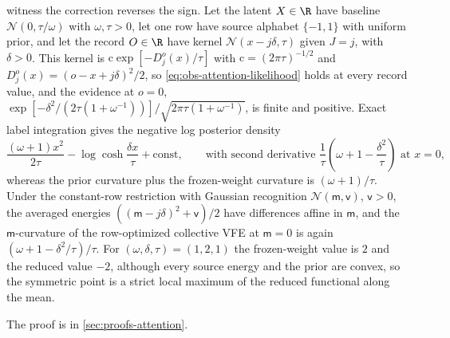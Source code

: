witness the correction reverses the sign. Let the latent \(X\in\R\) have
baseline \(\mathcal N(0,\tau/\omega)\) with \(\omega,\tau>0\), let one row have
source alphabet \(\{-1,1\}\) with uniform prior, and let the record \(O\in\R\)
have kernel \(\mathcal N(x-j\delta,\tau)\) given \(J=j\), with \(\delta>0\).
This kernel is \(\mathrm c\exp[-D_j^o(x)/\tau]\) with
\(\mathrm c=(2\pi\tau)^{-1/2}\) and \(D_j^o(x)=(o-x+j\delta)^2/2\), so
\eqref{eq:obs-attention-likelihood} holds at every record value, and the
evidence at \(o=0\),
\(\exp[-\delta^2/(2\tau(1+\omega^{-1}))]/\sqrt{2\pi\tau(1+\omega^{-1})}\), is
finite and positive. Exact label integration gives the negative log posterior
density
\begin{equation}
\frac{(\omega+1)x^2}{2\tau}-\log\cosh\frac{\delta x}{\tau}+\text{const},
\qquad
\text{with second derivative }\frac1\tau\left(\omega+1-\frac{\delta^2}{\tau}\right)
\text{ at }x=0,
\label{eq:obs-attention-reduced-witness}
\end{equation}
whereas the prior curvature plus the frozen-weight curvature is
\((\omega+1)/\tau\). Under the constant-row restriction with Gaussian
recognition \(\mathcal N(\mathsf m,\mathsf v)\), \(\mathsf v>0\), the averaged
energies \(((\mathsf m-j\delta)^2+\mathsf v)/2\) have differences affine in
\(\mathsf m\), and the \(\mathsf m\)-curvature of the row-optimized collective
VFE at \(\mathsf m=0\) is again \((\omega+1-\delta^2/\tau)/\tau\). For
\((\omega,\delta,\tau)=(1,2,1)\) the frozen-weight value is \(2\) and the
reduced value \(-2\), although every source energy and the prior are convex,
so the symmetric point is a strict local maximum of the reduced functional
along the mean.

The proof is in \cref{sec:proofs-attention}.

